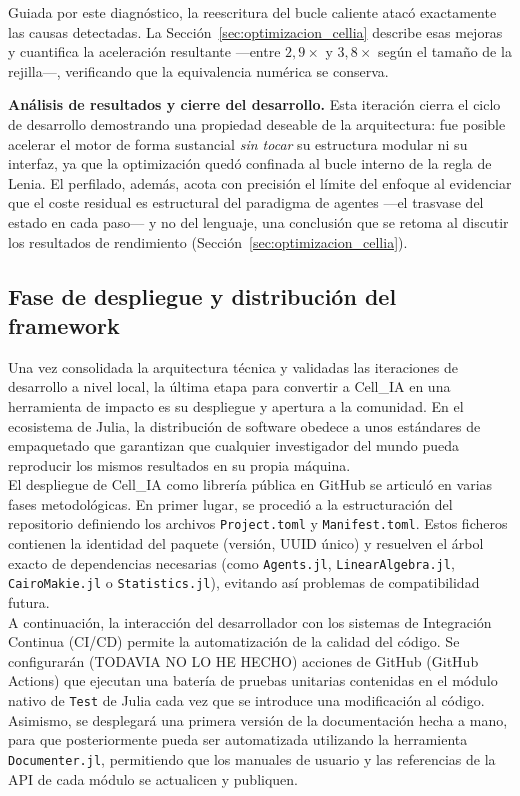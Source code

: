 \documentclass[runningheads]{llncs}
\begin{document}
Guiada por este diagnóstico, la reescritura del bucle caliente atacó exactamente
las causas detectadas. La Sección~\ref{sec:optimizacion_cellia} describe esas
mejoras y cuantifica la aceleración resultante —entre $2{,}9\times$ y
$3{,}8\times$ según el tamaño de la rejilla—, verificando que la equivalencia
numérica se conserva.

\textbf{Análisis de resultados y cierre del desarrollo.}
Esta iteración cierra el ciclo de desarrollo demostrando una propiedad deseable
de la arquitectura: fue posible acelerar el motor de forma sustancial \emph{sin
tocar} su estructura modular ni su interfaz, ya que la optimización quedó
confinada al bucle interno de la regla de Lenia. El perfilado, además, acota con
precisión el límite del enfoque al evidenciar que el coste residual es
estructural del paradigma de agentes —el trasvase del estado en cada paso— y no
del lenguaje, una conclusión que se retoma al discutir los resultados de
rendimiento (Sección~\ref{sec:optimizacion_cellia}).

\subsection{Fase de despliegue y distribución del framework}
Una vez consolidada la arquitectura técnica y validadas las iteraciones de desarrollo a nivel local, la última etapa para convertir a Cell\_IA en una herramienta de impacto es su despliegue y apertura a la comunidad. En el ecosistema de Julia, la distribución de software obedece a unos estándares de empaquetado que garantizan que cualquier investigador del mundo pueda reproducir los mismos resultados en su propia máquina.\\

El despliegue de Cell\_IA como librería pública en GitHub se articuló en varias fases metodológicas. En primer lugar, se procedió a la estructuración del repositorio definiendo los archivos \texttt{Project.toml} y \texttt{Manifest.toml}. Estos ficheros contienen la identidad del paquete (versión, UUID único) y resuelven el árbol exacto de dependencias necesarias (como \texttt{Agents.jl}, \texttt{LinearAlgebra.jl}, \texttt{CairoMakie.jl} o \texttt{Statistics.jl}), evitando así problemas de compatibilidad futura.\\

A continuación, la interacción del desarrollador con los sistemas de Integración Continua (CI/CD) permite la automatización de la calidad del código. Se configurarán (TODAVIA NO LO HE HECHO) acciones de GitHub (GitHub Actions) que ejecutan una batería de pruebas unitarias contenidas en el módulo nativo de \texttt{Test} de Julia cada vez que se introduce una modificación al código. Asimismo, se desplegará una primera versión de la documentación hecha a mano, para que posteriormente pueda ser automatizada utilizando la herramienta \texttt{Documenter.jl}, permitiendo que los manuales de usuario y las referencias de la API de cada módulo se actualicen y publiquen.\\
\end{document}
